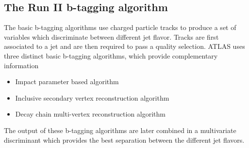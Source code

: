 \subsection{The Run II b-tagging algorithm}
The basic b-tagging algorithms use charged particle tracks to produce a set of variables which discriminate between different jet flavor. Tracks are first associated to a jet and are then required to pass a quality selection. ATLAS uses three distinct basic b-tagging algorithms, which provide complementary information
\begin{itemize}
\item Impact parameter based algorithm
\item Inclusive secondary vertex reconstruction algorithm
\item Decay chain multi-vertex reconstruction algorithm
\end{itemize}
The output of these b-tagging algorithms are later combined in a multivariate discriminant which provides the best separation between the different jet flavors.
